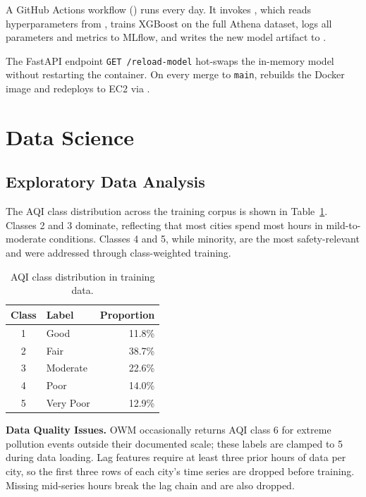 \documentclass[sigconf, nonacm]{acmart}
\begin{document}
A GitHub Actions workflow () runs
every day.  It invokes , which reads
hyperparameters from , trains
XGBoost on the full Athena dataset, logs all parameters
and metrics to MLflow, and writes the new model artifact
to .

The FastAPI endpoint \texttt{GET /reload-model}
hot-swaps the in-memory model without restarting the
container.  On every merge to \texttt{main},
 rebuilds the Docker image and redeploys
to EC2 via .

\section{Data Science}

\subsection{Exploratory Data Analysis}

The AQI class distribution across the training corpus is
shown in Table~\ref{tab:classdist}.  Classes 2 and 3
dominate, reflecting that most cities spend most hours in
mild-to-moderate conditions.  Classes 4 and 5, while
minority, are the most safety-relevant and were addressed
through class-weighted training.

\begin{table}[h]
  \caption{AQI class distribution in training data.}
  \label{tab:classdist}
  \small
  \begin{tabular}{@{}clr@{}}
    \toprule
    \textbf{Class} & \textbf{Label} & \textbf{Proportion} \\
    \midrule
    1 & Good      & 11.8\% \\
    2 & Fair      & 38.7\% \\
    3 & Moderate  & 22.6\% \\
    4 & Poor      & 14.0\% \\
    5 & Very Poor & 12.9\% \\
    \bottomrule
  \end{tabular}
\end{table}

\textbf{Data Quality Issues.}
OWM occasionally returns AQI class 6 for extreme pollution
events outside their documented scale; these labels are
clamped to 5 during data loading.  Lag features require at
least three prior hours of data per city, so the first three
rows of each city's time series are dropped before training.
Missing mid-series hours break the lag chain and are
also dropped.
\end{document}
